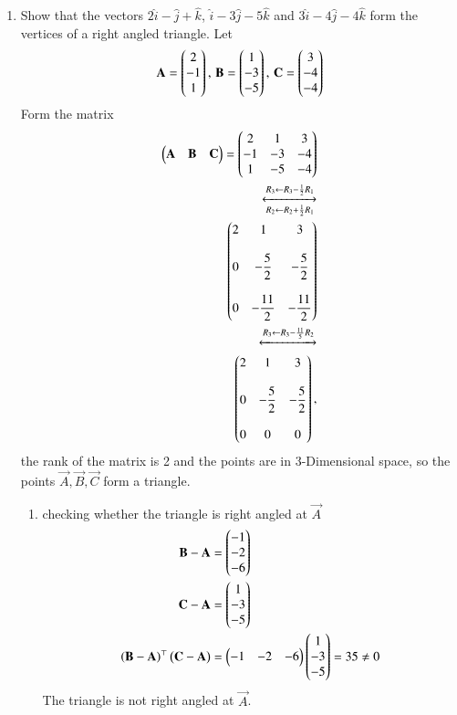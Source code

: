 \documentclass[journal,12pt,twocolumn]{IEEEtran}
\begin{document}
\begin{enumerate}
\item Show that the vectors $2\hat{i}-\hat{j}+\hat{k}$, $\hat{i}-3\hat{j}-5\hat{k}$ and $3\hat{i}-4\hat{j}-4\hat{k}$ form the vertices of a right angled triangle.
\fi
Let
\begin{align}
\mathbf{A} = \begin{pmatrix}2\\-1\\1\end{pmatrix}, \, \mathbf{B} = \begin{pmatrix}1\\-3\\-5\end{pmatrix}, \, \mathbf{C}=\begin{pmatrix}3\\-4\\-4\end{pmatrix} 
\end{align}
 Form the matrix 
\begin{align}
\begin{pmatrix}\mathbf{A}&\mathbf{B}&\mathbf{C}\end{pmatrix} = \begin{pmatrix}2&1&3\\-1&-3&-4\\1&-5&-4\end{pmatrix}\\
\xleftrightarrow [R_2 \leftarrow R_2+\frac{1}{2}R_1]{R_3 \leftarrow R_3-\frac{1}{2}R_1} \\
\begin{pmatrix}2&1&3\\ \\0&-\dfrac{5}{2}&-\dfrac{5}{2}\\\\0&-\dfrac{11}{2}&-\dfrac{11}{2}\end{pmatrix}\\
\xleftrightarrow[]{R_3 \leftarrow R_3-\frac{11}{5}R_2}\\
\begin{pmatrix}2&1&3\\ \\0&-\dfrac{5}{2}&-\dfrac{5}{2}\\\\0&0&0\end{pmatrix},
\end{align}
the rank of the matrix is 2 and the points are in 3-Dimensional space, so the points $\vec{A},\vec{B},\vec{C}$ form a triangle.
\begin{enumerate}
\item checking whether the triangle is right angled at $\vec{A}$
\begin{align}
\mathbf{B}-\mathbf{A} &= \begin{pmatrix}-1\\-2\\-6\end{pmatrix} \\
\mathbf{C}-\mathbf{A} &= \begin{pmatrix}1\\-3\\-5\end{pmatrix} \\
\left(\mathbf{B}-\mathbf{A}\right)^{\top}\left(\mathbf{C}-\mathbf{A}\right) &= \begin{pmatrix}-1&-2&-6\end{pmatrix}\begin{pmatrix}1\\-3\\-5\end{pmatrix} = 35
\neq 0
\end{align}
The triangle is not right angled at $\vec{A}$.

\end{enumerate}
\end{enumerate}
\end{document}
